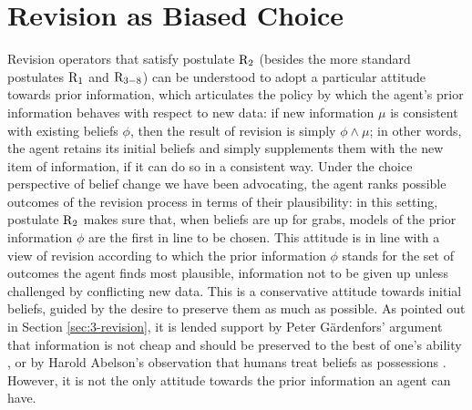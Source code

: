 \chapter{Revision as Biased Choice}\label{ch:4}

Revision operators that satisfy postulate $\mathrm{R}_{2}$
(besides the more standard postulates $\mathrm{R}_{1}$ and $\mathrm{R}_{3-8}$)
can be understood to adopt a particular attitude
towards prior information,
which articulates the policy 
by which the agent's prior information
behaves with respect to new data: 
if new information $\mu$
is consistent with existing beliefs $\phi$, 
then the result of revision is simply $\phi\land\mu$;
in other words, the agent retains its initial beliefs
and simply supplements them with the new item of information,
if it can do so in a consistent way.
Under the choice perspective of belief change 
we have been advocating,
the agent ranks possible outcomes of the revision process
in terms of their plausibility:
in this setting, postulate $\mathrm{R}_{2}$ 
makes sure that, when beliefs are up for grabs,
models of the prior information $\phi$ are the first in line
to be chosen.
This attitude is in line with a view of revision according to which 
the prior information $\phi$ 
stands for the set of outcomes the agent finds most plausible,
information not to be given up unless challenged
by conflicting new data.
This is a conservative attitude towards initial beliefs,
guided by the desire to preserve them as much as possible.
As pointed out in Section \ref{sec:3-revision},
it is lended support by Peter G\"ardenfors' argument that
information is not cheap and should be preserved to the best
of one's ability \cite[p.\~49]{Gardenfors88}, 
or by Harold Abelson's observation that humans treat beliefs as 
possessions \cite{Abelson86}.
However, it is not the only attitude 
towards the prior information an agent can have.

